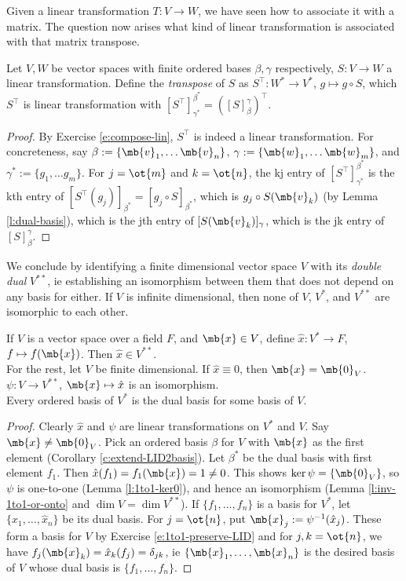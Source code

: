Given a linear transformation $T:V \to W$, we have seen how to associate it with a matrix. The question now arises what kind of linear transformation is associated with that matrix transpose.
\begin{lem}
Let $V,W$ be vector spaces with finite ordered bases $\beta, \gamma$ respectively, $S:V \to W$ a linear transformation. Define the \emph{transpose} of $S$ as $S^\top:W^* \to V^*$, $g \mapsto g \circ S$, which $S^\top$ is linear transformation with $[S^\top]_{\gamma^*}^{\beta^*}=([S]_\beta^\gamma)^\top$.
\end{lem}
\begin{proof}%
By Exercise \ref{e:compose-lin}, $S^\top$ is indeed a linear transformation. For concreteness, say $\beta:= \{ \mb{v}_1, \ldots \mb{v}_n \}$, $\gamma:= \{ \mb{w}_1, \ldots \mb{w}_m \}$, and $\gamma^*:= \{ g_1, \ldots g_m \}$. For $j=\ot{m}$ and $k=\ot{n}$, the kj entry of $[S^\top]_{\gamma^*}^{\beta^*}$ is the kth entry of $[S^\top(g_j)]_{\beta^*}=[g_j \circ S]_{\beta^*}$, which is $g_j \circ S(\mb{v}_k)$ (by Lemma \ref{l:dual-basis}), which is the jth entry of $[S(\mb{v}_k)]_\gamma$, which is the jk entry of $[S]_\beta^\gamma$.
\end{proof}
We conclude by identifying a finite dimensional vector space $V$ with its \emph{double dual} $V^{**}$, ie establishing an isomorphism between them that does not depend on any basis for either. If $V$ is infinite dimensional, then none of $V$, $V^*$, and $V^{**}$ are isomorphic to each other.
\begin{lem}
If $V$ is a vector space over a field $F$, and $\mb{x} \in V$, define $\hat{x}:V^* \to F$, $f \mapsto f(\mb{x})$. Then $\hat{x}\in V^{**}$.\\
For the rest, let $V$ be finite dimensional. If $\hat{x}\equiv 0$, then $\mb{x}= \mb{0}_V$. $\psi:V \to V^{**}$, $\mb{x}\mapsto \hat{x}$ is an isomorphism.\\
Every ordered basis of $V^*$ is the dual basis for some basis of $V$.
\end{lem}
\begin{proof}
Clearly $\hat{x}$ and $\psi$ are linear transformations on $V^*$ and $V$.
Say $\mb{x}\neq \mb{0}_V$. Pick an ordered basis $\beta$ for $V$ with $\mb{x}$ as the first element (Corollary \ref{c:extend-LID2basis}). Let $\beta^*$ be the dual basis with first element $f_1$. Then $\hat{x}(f_1)=f_1(\mb{x})=1 \neq 0$. This shows $\ker \psi= \{ \mb{0}_V \}$, so $\psi$ is one-to-one (Lemma \ref{l:1to1-ker0}), and hence an isomorphism (Lemma \ref{l:inv-1to1-or-onto} and $\dim V= \dim V^{**}$).
If $\{ f_1, \ldots,f_n \}$ is a basis for $V^*$, let $\{ \hat{x}_1, \ldots, \hat{x}_n \}$ be its dual basis. For $j=\ot{n}$, put $\mb{x}_j:= \psi^{-1}(\hat{x}_j)$. These form a basis for $V$ by Exercise \ref{e:1to1-preserve-LID} and for $j,k=\ot{n}$, we have $f_j(\mb{x}_k)=\hat{x}_k(f_j)= \delta_{jk}$, ie $\{ \mb{x}_1, \ldots, \mb{x}_n \}$ is the desired basis of $V$ whose dual basis is $\{ f_1, \ldots,f_n \}$.
\end{proof}

